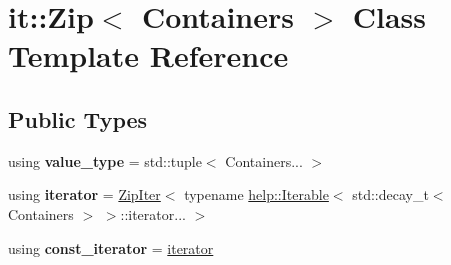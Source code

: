 \hypertarget{classit_1_1Zip}{}\section{it\+:\+:Zip$<$ Containers $>$ Class Template Reference}
\label{classit_1_1Zip}
\subsection*{Public Types}
\begin{DoxyCompactItemize}
\item 
using {\bfseries value\+\_\+type} = std\+::tuple$<$ Containers... $>$\hypertarget{classit_1_1Zip_a9baa8c30fff173711c97c3341c28ea3b}{}\label{classit_1_1Zip_a9baa8c30fff173711c97c3341c28ea3b}

\item 
using {\bfseries iterator} = \hyperlink{classit_1_1ZipIter}{Zip\+Iter}$<$ typename \hyperlink{structit_1_1help_1_1Iterable}{help\+::\+Iterable}$<$ std\+::decay\+\_\+t$<$ Containers $>$ $>$\+::iterator... $>$\hypertarget{classit_1_1Zip_ae66c0e526070cf143256acddcc2c53cb}{}\label{classit_1_1Zip_ae66c0e526070cf143256acddcc2c53cb}

\item 
using {\bfseries const\+\_\+iterator} = \hyperlink{classit_1_1ZipIter}{iterator}\hypertarget{classit_1_1Zip_ac9c7dacbb33c23f586cb8886fdd58275}{}\label{classit_1_1Zip_ac9c7dacbb33c23f586cb8886fdd58275}

\end{DoxyCompactItemize}
